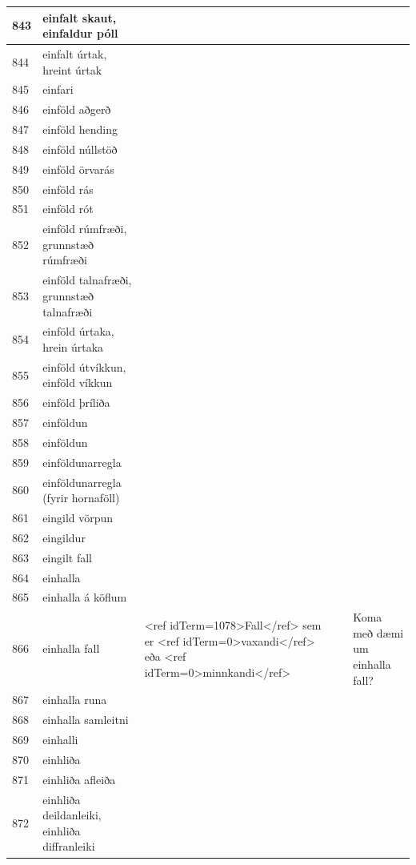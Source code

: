 \begin{longtable}{p{}|p{}|p{}|p{}|p{}}
\hline
843 & einfalt skaut, einfaldur póll &  &  &  \\
\hline
844 & einfalt úrtak, hreint úrtak &  &  &  \\
\hline
845 & einfari &  &  &  \\
\hline
846 & einföld aðgerð &  &  &  \\
\hline
847 & einföld hending &  &  &  \\
\hline
848 & einföld núllstöð &  &  &  \\
\hline
849 & einföld örvarás &  &  &  \\
\hline
850 & einföld rás &  &  &  \\
\hline
851 & einföld rót &  &  &  \\
\hline
852 & einföld rúmfræði, grunnstæð rúmfræði &  &  &  \\
\hline
853 & einföld talnafræði, grunnstæð talnafræði &  &  &  \\
\hline
854 & einföld úrtaka, hrein úrtaka &  &  &  \\
\hline
855 & einföld útvíkkun, einföld víkkun &  &  &  \\
\hline
856 & einföld þríliða &  &  &  \\
\hline
857 & einföldun &  &  &  \\
\hline
858 & einföldun &  &  &  \\
\hline
859 & einföldunarregla &  &  &  \\
\hline
860 & einföldunarregla (fyrir hornaföll) &  &  &  \\
\hline
861 & eingild vörpun &  &  &  \\
\hline
862 & eingildur &  &  &  \\
\hline
863 & eingilt fall &  &  &  \\
\hline
864 & einhalla &  &  &  \\
\hline
865 & einhalla á köflum &  &  &  \\
\hline
866 & einhalla fall & <ref idTerm=1078>Fall</ref> sem er <ref idTerm=0>vaxandi</ref> eða <ref idTerm=0>minnkandi</ref> &  & Koma með dæmi um einhalla fall? \\
\hline
867 & einhalla runa &  &  &  \\
\hline
868 & einhalla samleitni &  &  &  \\
\hline
869 & einhalli &  &  &  \\
\hline
870 & einhliða &  &  &  \\
\hline
871 & einhliða afleiða &  &  &  \\
\hline
872 & einhliða deildanleiki, einhliða diffranleiki &  &  &  \\

\end{longtable}
